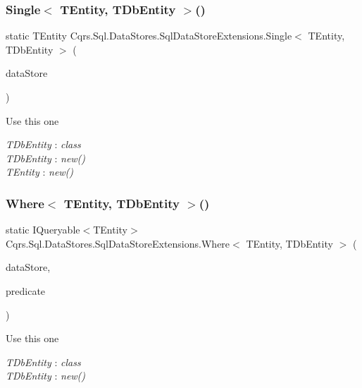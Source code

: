\subsubsection{\texorpdfstring{Single$<$ T\+Entity, T\+Db\+Entity $>$()}{Single< TEntity, TDbEntity >()}}
{\footnotesize\ttfamily static T\+Entity Cqrs.\+Sql.\+Data\+Stores.\+Sql\+Data\+Store\+Extensions.\+Single$<$ T\+Entity, T\+Db\+Entity $>$ (\begin{DoxyParamCaption}\item[{this I\+Enumerable$<$ T\+Entity $>$}]{data\+Store }\end{DoxyParamCaption})\hspace{0.3cm}{\ttfamily [static]}}



Use this one 

\begin{Desc}
\item[Type Constraints]\begin{description}
\item[{\em T\+Db\+Entity} : {\em class}]\item[{\em T\+Db\+Entity} : {\em new()}]\item[{\em T\+Entity} : {\em new()}]\end{description}
\end{Desc}
\mbox{\label{classCqrs_1_1Sql_1_1DataStores_1_1SqlDataStoreExtensions_a77e339885a9e26ff6bcf5b5bbe24b19d}} 
\subsubsection{\texorpdfstring{Where$<$ T\+Entity, T\+Db\+Entity $>$()}{Where< TEntity, TDbEntity >()}}
{\footnotesize\ttfamily static I\+Queryable$<$T\+Entity$>$ Cqrs.\+Sql.\+Data\+Stores.\+Sql\+Data\+Store\+Extensions.\+Where$<$ T\+Entity, T\+Db\+Entity $>$ (\begin{DoxyParamCaption}\item[{this \hyperlink{interfaceCqrs_1_1DataStores_1_1IDataStore}{I\+Data\+Store}$<$ T\+Entity $>$}]{data\+Store,  }\item[{Expression$<$ Func$<$ T\+Entity, bool $>$$>$}]{predicate }\end{DoxyParamCaption})\hspace{0.3cm}{\ttfamily [static]}}



Use this one 

\begin{Desc}
\item[Type Constraints]\begin{description}
\item[{\em T\+Db\+Entity} : {\em class}]\item[{\em T\+Db\+Entity} : {\em new()}]\end{description}
\end{Desc}
